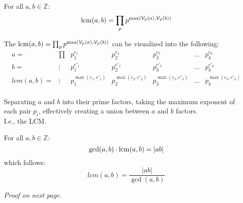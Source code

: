 \newpage

\begin{theo}

    \label{theo:LCM_abstracted}

    For all $a,b\in\mathbb{Z}$:
    \[\operatorname{lcm}(a,b) = \prod_{p} p^{\max(\mathcal{V}_p(a),\mathcal{V}_p(b))}\]
\end{theo}

\begin{Proof}

    \label{proof:lcm_abstracted}

    The $\operatorname{lcm}(a,b) = \prod_{p} p^{\max(\mathcal{V}_p(a),\mathcal{V}_p(b))}$ can be visualized into the following:
    \[
    \begin{array}{ccc|c|c|c|c}
    
    a=&\prod&p_1^{e_1} & p_2^{e_2} & p_3^{e_3} & \dots & p_k^{e_k} \\
    b=&\vdots&p_1^{e'_1} & p_2^{e'_2} & p_3^{e'_3} & \dots & p_k^{e'_k} \\
    \hline
    lcm(a,b)=&\vdots&p_1^{\max(e_1, e'_1)} & p_2^{\max(e_2, e'_2)} & p_3^{\max(e_3, e'_3)} & \dots & p_k^{\max(e_k, e'_k)} \\

    \end{array}
    \]

    \noindent
    Separating $a$ and $b$ into their prime factors, taking the maximum exponent of each pair $p_i$,
    effectively creating a union between $a$ and $b$ factors.\\
    
    \noindent
    I.e., the LCM.
\end{Proof}

\begin{theo}

    \label{theo:gcd_lcm_relationship}

    For all $a,b\in\mathbb{Z}$:
    \[\gcd(a,b)\cdot\operatorname{lcm}(a,b) = |ab|\]
    which follows:
    \LARGE \[lcm(a,b) = \dfrac{|ab|}{\gcd(a,b)}\]
\end{theo}

\begin{center}
    \textit{Proof on next page.}
\end{center}


    
    

\newpage

